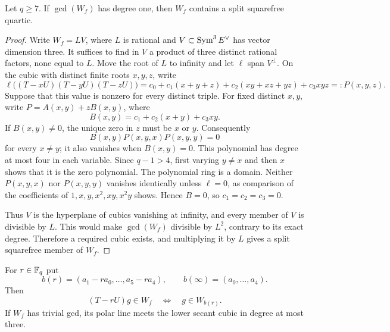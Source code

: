 \begin{lemma}\label{lem:r6-gcd1}%
%
Let \(q\geq7\).  If \(\gcd(W_f)\) has degree one, then \(W_f\)
contains a split squarefree quartic.
\end{lemma}

\begin{proof}
Write \(W_f=L V\), where \(L\) is rational and
\(V\subset\operatorname{Sym}^3E^\vee\) has vector dimension three.  It suffices to
find in \(V\) a product of three distinct rational factors, none equal
to \(L\).  Move the root of \(L\) to infinity and let
\(\ell\) span \(V^\perp\).  On the cubic with distinct finite roots
\(x,y,z\), write
\[
 \ell\bigl((T-xU)(T-yU)(T-zU)\bigr)
 =c_0+c_1(x+y+z)+c_2(xy+xz+yz)+c_3xyz=:P(x,y,z).
\]
Suppose that this value is nonzero for every distinct triple.  For
fixed distinct \(x,y\), write \(P=A(x,y)+zB(x,y)\), where
\[
 B(x,y)=c_1+c_2(x+y)+c_3xy.
\]
If \(B(x,y)\ne0\), the unique zero in \(z\) must be \(x\) or \(y\).
Consequently
\[
 B(x,y)P(x,y,x)P(x,y,y)=0
\]
for every \(x\ne y\); it also vanishes when \(B(x,y)=0\).
This polynomial has degree at most four in each variable.  Since
\(q-1>4\), first varying \(y\ne x\) and then \(x\) shows that it is
the zero polynomial.  The polynomial ring is a domain.  Neither
\(P(x,y,x)\) nor \(P(x,y,y)\) vanishes identically unless
\(\ell=0\), as comparison of the coefficients of
\(1,x,y,x^2,xy,x^2y\) shows.  Hence \(B=0\), so
\(c_1=c_2=c_3=0\).

Thus \(V\) is the hyperplane of cubics vanishing at infinity, and
every member of \(V\) is divisible by \(L\).  This would make
\(\gcd(W_f)\) divisible by \(L^2\), contrary to its exact degree.
Therefore a required cubic exists, and multiplying it by \(L\)
gives a split squarefree member of \(W_f\).
\end{proof}

\begin{proposition}
\label{prop:r6-secant}%
%
%
For $r\in\mathbb F_q$ put
\[
 b(r)=(a_1-ra_0,\ldots,a_5-ra_4),\qquad
 b(\infty)=(a_0,\ldots,a_4).
\]
Then
\[
 (T-rU)g\in W_f\quad\Longleftrightarrow\quad g\in W_{b(r)}.
\]
If $W_f$ has trivial gcd, its polar line meets the lower secant cubic
in degree at most three.
\end{proposition}

